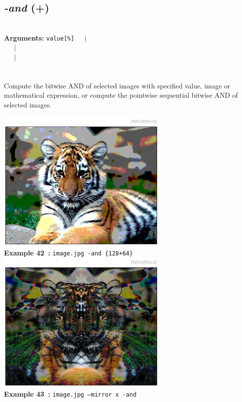 \documentclass[a4paper,11pt,twoside]{book}
\begin{document}
\subsection{\emph{-and} (+)}\vspace*{-0.5em}
~\\\textbf{Arguments: } 
{\small \texttt{value[\%]}}~~~$|$\\
\hspace*{2.2cm}{\small \texttt{[image]}}~~~$|$\\
~~~$|$\\
\\~\\
Compute the bitwise AND of selected images with specified value, image or mathematical
expression, or compute the pointwise sequential bitwise AND of selected images.
\begin{center}\includegraphics[keepaspectratio=true,height=7cm,width=\textwidth]{img/gmic_def42.jpg}\\
{\footnotesize \textbf{Example 42~:} \texttt{image.jpg -and \{128+64\}}}
\\\includegraphics[keepaspectratio=true,height=7cm,width=\textwidth]{img/gmic_def43.jpg}\\
{\footnotesize \textbf{Example 43~:} \texttt{image.jpg --mirror x -and}}
\end{center}
\end{document}
